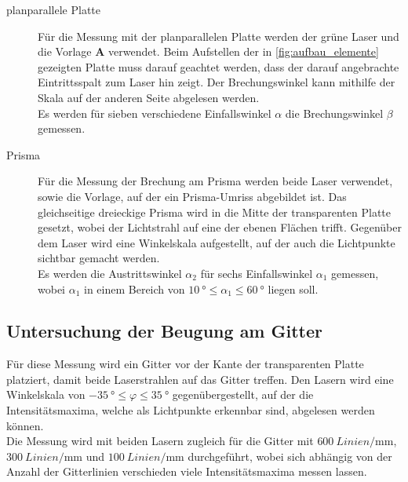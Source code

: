     \begin{description}
    \item[planparallele Platte]
    \label{sec:durchfuehrung:brechung:planparallele_platte}
    Für die Messung mit der planparallelen Platte werden der grüne Laser und die Vorlage \textbf{A} verwendet.
    Beim Aufstellen der in \autoref{fig:aufbau_elemente} gezeigten Platte
    muss darauf geachtet werden,
    dass der darauf angebrachte Eintrittsspalt zum Laser hin zeigt.
    Der Brechungswinkel kann mithilfe der Skala auf der anderen Seite abgelesen werden.\\
    Es werden für sieben verschiedene Einfallswinkel $\alpha$ die Brechungswinkel $\beta$ gemessen.

    \item[Prisma]
    Für die Messung der Brechung am Prisma werden beide Laser verwendet,
    sowie die Vorlage, auf der ein Prisma-Umriss abgebildet ist.
    Das gleichseitige dreieckige Prisma wird in die Mitte der transparenten Platte gesetzt,
    wobei der Lichtstrahl auf eine der ebenen Flächen trifft.
    Gegenüber dem Laser wird eine Winkelskala aufgestellt,
    auf der auch die Lichtpunkte sichtbar gemacht werden.\\
    Es werden die Austrittswinkel $\alpha_2$ für sechs Einfallswinkel $\alpha_1$ gemessen,
    wobei $\alpha_1$ in einem Bereich von $\SI{10}{\degree} \leq \alpha_1 \leq \SI{60}{\degree}$ liegen soll.
  \end{description}


\subsection{Untersuchung der Beugung am Gitter}
\label{sec:durchfuehrung:beugung}

    Für diese Messung wird ein Gitter vor der Kante der transparenten Platte platziert,
    damit beide Laserstrahlen auf das Gitter treffen.
    Den Lasern wird eine Winkelskala von $\SI{-35}{\degree} \leq \varphi \leq \SI{35}{\degree}$ gegenübergestellt,
    auf der die Intensitätsmaxima, welche als Lichtpunkte erkennbar sind,
    abgelesen werden können.\\
    Die Messung wird mit beiden Lasern zugleich
    für die Gitter mit $\SI{600}{{Linien}\per\milli\meter}$,
    $\SI{300}{{Linien}\per\milli\meter}$ und $\SI{100}{{Linien}\per\milli\meter}$
    durchgeführt,
    wobei sich abhängig von der Anzahl der Gitterlinien
    verschieden viele Intensitätsmaxima messen lassen.

